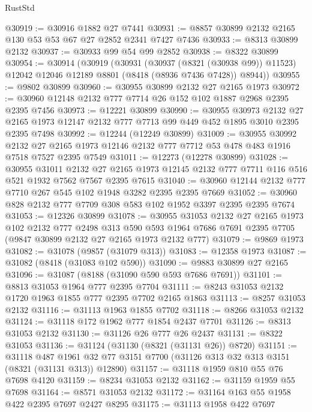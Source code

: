 \begin{lexlean}{RustStd}
\begin{coremodule}
@30919 := @30916 @1882 @27 @7441
@30931 := @8857 @30899 @2132 @2165 @130 @53 @53 @67 @27 @2852 @2341 @7427 @7436
@30933 := @8313 @30899 @2132
@30937 := @30933 @99 @54 @99 @2852
@30938 := @8322 @30899
@30954 := @30914
    (@30919
      (@30931
        (@30937 (@8321 (@30938 @99)) @11523)
        @12042
        @12046
        @12189
        @8801
        (@8418 (@8936 @7436 @7428))
        @8944))
@30955 := @9802 @30899
@30960 := @30955 @30899 @2132 @27 @2165 @1973
@30972 := @30960 @12148 @2132 @777 @7714 @26 @152 @102 @1887 @2968 @2395 @2395 @7456
@30973 := @12221 @30899
@30990 := @30955
    @30973
    @2132
    @27
    @2165
    @1973
    @12147
    @2132
    @777
    @7713
    @99
    @449
    @452
    @1895
    @3010
    @2395
    @2395
    @7498
@30992 := @12244 (@12249 @30899)
@31009 := @30955
    @30992
    @2132
    @27
    @2165
    @1973
    @12146
    @2132
    @777
    @7712
    @53
    @478
    @483
    @1916
    @7518
    @7527
    @2395
    @7549
@31011 := @12273 (@12278 @30899)
@31028 := @30955
    @31011
    @2132
    @27
    @2165
    @1973
    @12145
    @2132
    @777
    @7711
    @116
    @516
    @521
    @1932
    @7562
    @7567
    @2395
    @7615
@31040 := @30960 @12144 @2132 @777 @7710 @267 @545 @102 @1948 @3282 @2395 @2395 @7669
@31052 := @30960 @828 @2132 @777 @7709 @308 @583 @102 @1952 @3397 @2395 @2395 @7674
@31053 := @12326 @30899
@31078 := @30955
    @31053
    @2132
    @27
    @2165
    @1973
    @102
    @2132
    @777
    @2498
    @313
    @590
    @593
    @1964
    @7686
    @7691
    @2395
    @7705
    (@9847 @30899 @2132 @27 @2165 @1973 @2132 @777)
@31079 := @9869 @1973
@31082 := @31078 (@9857 (@31079 @313))
@31083 := @12358 @1973
@31087 := @31082 (@8418 (@31083 @102 @590))
@31090 := @9883 @30899 @27 @2165
@31096 := @31087 (@8188 (@31090 @590 @593 @7686 @7691))
@31101 := @8813 @31053 @1964 @777 @2395 @7704
@31111 := @8243 @31053 @2132 @1720 @1963 @1855 @777 @2395 @7702 @2165 @1863
@31113 := @8257 @31053 @2132
@31116 := @31113 @1963 @1855 @7702
@31118 := @8266 @31053 @2132
@31124 := @31118 @172 @1962 @777 @1854 @2437 @7701
@31126 := @8313 @31053 @2132
@31130 := @31126 @26 @777 @26 @2437
@31131 := @8322 @31053
@31136 := @31124 (@31130 (@8321 (@31131 @26)) @8720)
@31151 := @31118
    @487
    @1961
    @32
    @77
    @3151
    @7700
    (@31126 @313 @32 @313 @3151 (@8321 (@31131 @313)) @12890)
@31157 := @31118 @1959 @810 @55 @76 @7698 @4120
@31159 := @8234 @31053 @2132
@31162 := @31159 @1959 @55 @7698
@31164 := @8571 @31053 @2132
@31172 := @31164 @163 @55 @1958 @422 @2395 @7697 @2427 @8295
@31175 := @31113 @1958 @422 @7697

\end{coremodule}
\end{lexlean}
